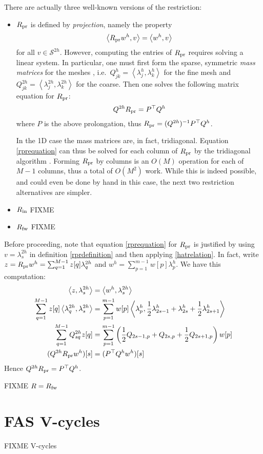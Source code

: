 \documentclass[letterpaper,final,12pt,reqno]{amsart}
\newcommand{\ip}[2]{\left<#1,#2\right>}
\begin{document}
There are actually three well-known versions of the restriction:
\begin{itemize}
\item $R_{\text{pr}}$ is defined by \emph{projection}, namely the property
\begin{equation}
  \ip{\Rpr w^h}{v} = \ip{w^h}{v} \label{rprdefinition}
\end{equation}
for all $v\in \mathcal{S}^{2h}$.  However, computing the entries of $R_{\text{pr}}$ requires solving a linear system.  In particular, one must first form the sparse, symmetric \emph{mass matrices} for the meshes \cite{Elmanetal2014}, i.e.~$Q_{jk}^{h} = \ip{\lambda_j^{h}}{\lambda_k^{h}}$ for the fine mesh and $Q_{jk}^{2h} = \ip{\lambda_j^{2h}}{\lambda_k^{2h}}$ for the coarse.  Then one solves the following matrix equation for $R_{\text{pr}}$:
\begin{equation}
  Q^{2h} R_{\text{pr}} = P^\top Q^{h}  \label{rprequation}
\end{equation}
where $P$ is the above prolongation, thus $R_{\text{pr}} = (Q^{2h})^{-1} P^\top Q^{h}$.

In the 1D case the mass matrices are, in fact, tridiagonal.  Equation \eqref{rprequation} can thus be solved for each column of $R_{\text{pr}}$ by the tridiagonal algorithm \cite{TrefethenBau1997}.  Forming $R_{\text{pr}}$ by columns is an $O(M)$ operation for each of $M-1$ columns, thus a total of $O(M^2)$ work.  While this is indeed possible, and could even be done by hand in this case, the next two restriction alternatives are simpler.
\item $R_{\text{in}}$ FIXME
\item $R_{\text{fw}}$ FIXME
\end{itemize}

Before proceeding, note that equation \eqref{rprequation} for $R_{\text{pr}}$ is justified by using $v=\lambda_s^{2h}$ in definition \eqref{rprdefinition} and then applying \eqref{hatrelation}.  In fact, write $z = R_{\text{pr}} w^h = \sum_{q=1}^{M-1} z[q] \lambda_q^{2h}$ and $w^h = \sum_{p=1}^{m-1} w[p] \lambda_p^{h}$.  We have this computation:
\begin{align*}
\ip{z}{\lambda_s^{2h}} &= \ip{w^h}{\lambda_s^{2h}} \\
\sum_{q=1}^{M-1} z[q] \ip{\lambda_q^{2h}}{\lambda_s^{2h}} &= \sum_{p=1}^{m-1} w[p] \ip{\lambda_p^{h}}{\frac{1}{2} \lambda_{2s-1}^{h} + \lambda_{2s}^{h} + \frac{1}{2} \lambda_{2s+1}^{h}} \\
\sum_{q=1}^{M-1} Q_{sq}^{2h} z[q] &= \sum_{p=1}^{m-1} \left(\frac{1}{2} Q_{2s-1,p} + Q_{2s,p} + \frac{1}{2} Q_{2s+1,p}\right) w[p] \\
(Q^{2h} \Rpr w^h)[s] &= (P^\top Q^h w^h)[s]
\end{align*}
Hence $Q^{2h} R_{\text{pr}} = P^\top Q^h$.

FIXME $R=R_{\text{fw}}$



\section{FAS V-cycles}

FIXME V-cycles

\small

\bigskip


\end{document}

